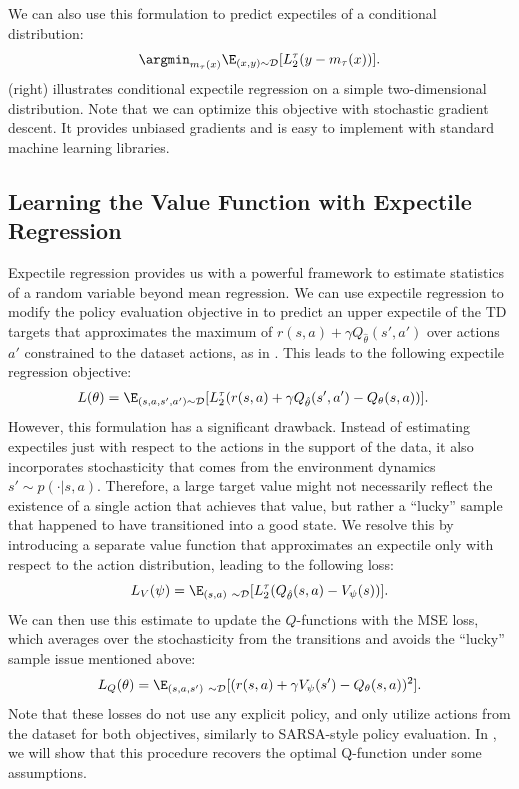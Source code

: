 \documentclass{article} %
\begin{document}
We can also use this formulation to predict expectiles of a conditional distribution:
$$\argmin_{m_\tau(x)} \E_{(x,y)\sim \D}[L_2^\tau(y-m_\tau(x))].$$
 (right) illustrates conditional expectile regression on a simple two-dimensional distribution. Note that we can optimize this objective with stochastic gradient descent. It provides unbiased gradients and is easy to implement with standard machine learning libraries. 


\subsection{Learning the Value Function with Expectile Regression}

Expectile regression provides us with a powerful framework to estimate statistics of a random variable beyond mean regression. We can use expectile regression to modify the policy evaluation objective in  to predict an upper expectile of the TD targets that approximates the maximum of $r(s,a) + \gamma Q_{\hat{\theta}}(s',a')$ over actions $a'$ constrained to the dataset actions, as in .
This leads to the following expectile regression objective:
\begin{align*}
&L(\theta)=\E_{(s,a,s',a')\sim\D}[L_2^\tau(r(s,a) + \gamma Q_{\hat{\theta}}(s', a')- Q_\theta(s,a))].
\end{align*}
However, this formulation has a significant drawback. Instead of estimating expectiles just with respect to the actions in the support of the data, it also incorporates stochasticity that comes from the environment dynamics $s'\sim p(\cdot|s,a)$. Therefore, a large target value might not necessarily reflect the existence of a single action that achieves that value, but rather a ``lucky'' sample that happened to have transitioned into a good state.
We resolve this by introducing a separate value function that approximates an expectile only with respect to the action distribution, leading to the following loss:
\begin{equation}
    \label{eqn:fit_v}
    L_V(\psi) = \E_{(s,a)~\sim \D}[L_2^\tau(Q_{\hat{\theta}}(s,a) - V_\psi(s))].
\end{equation}
We can then use this estimate to update the $Q$-functions with the MSE loss, which averages over the stochasticity from the transitions and avoids the ``lucky'' sample issue mentioned above:
\begin{equation}
    \label{eqn:fit_q}
    L_Q(\theta) = \E_{(s,a,s')~\sim \D}[(r(s,a) + \gamma V_\psi(s') - Q_{\theta}(s,a))^2].
\end{equation}
Note that these losses do not use any explicit policy, and only utilize actions from the dataset for both objectives, similarly to SARSA-style policy evaluation.
In , we will show that this procedure recovers the optimal Q-function under some assumptions.
\end{document}
